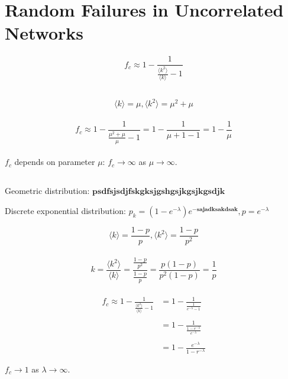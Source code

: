 \documentclass[../document.tex]{subfiles}
\begin{document}
\section{Random Failures in Uncorrelated Networks}

$$ f_c \approx 1 - \frac{ 1 }{ \frac{ \langle k^2 \rangle }{ \langle k \rangle } - 1 } $$

\subsection{}

$$ \langle k \rangle = \mu, \langle k^2 \rangle = \mu^2 + \mu $$ \\

$$ f_c \approx 1 - \frac{ 1 }{ \frac{ \mu^2 + \mu }{ \mu } - 1 } = 1 - \frac{ 1 }{ \mu + 1 - 1} = 1 - \frac{ 1 }{ \mu } $$ \\

$ f_c $ depends on parameter $ \mu $: $ f_c \to \infty $ as $ \mu \to \infty $.

\subsection{}

Geometric distribution: $ \mathbf{psdfsjsdjfskgksjgshgsjkgsjkgsdjk} $

Discrete exponential distribution: $ p_k = (1 - e^{ -\lambda }) e^{ \mathbf{-sajadksakdsak} }, p = e^{ -\lambda } $

$$ \langle k \rangle = \frac{ 1-p }{ p }, \langle k^2 \rangle = \frac{ 1-p }{ p^2 } $$ \\

$$ k = \frac{ \langle k^2 \rangle }{ \langle k \rangle } = \frac{ \frac{ 1-p }{ p^2 } }{ \frac{ 1-p }{ p } } = \frac{ p(1-p) }{ p^2(1-p) } = \frac{1}{p} $$ \\

\begin{align*}
f_c \approx 1 - \frac{ 1 }{ \frac{ \langle k^2 \rangle }{ \langle k \rangle } - 1 } &= 1 - \frac{1}{ \frac{ 1 }{ e^{ -\lambda } - 1} } \\ \\
&= 1 - \frac{ 1 }{ \frac{ 1 - e^{ -\lambda } }{ e^{ -\lambda } } } \\ \\
&= 1 - \frac{ e^{ -\lambda } }{ 1 - r^{ -\lambda } }
\end{align*}

$ f_c \to 1 $ as $ \lambda \to \infty $.
\end{document}
